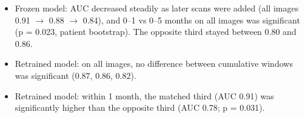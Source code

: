 \documentclass[11pt]{article}
\begin{document}
\begin{itemize}
\item Frozen model: AUC decreased steadily as later scans were added (all images 0.91 $\to$ 0.88 $\to$ 0.84), and 0--1 vs 0--5 months on all images was significant (p = 0.023, patient bootstrap). The opposite third stayed between 0.80 and 0.86.
\item Retrained model: on all images, no difference between cumulative windows was significant (0.87, 0.86, 0.82).
\item Retrained model: within 1 month, the matched third (AUC 0.91) was significantly higher than the opposite third (AUC 0.78; p = 0.031).
\end{itemize}
\end{document}
